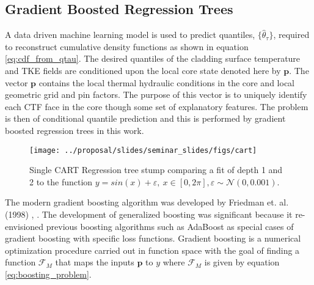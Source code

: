 \subsection{Gradient Boosted Regression Trees}
\label{chap:GBRT}

A data driven machine learning model is used to predict quantiles, $\{ \hat \theta_\tau \}$, required to reconstruct cumulative density functions as shown in equation \ref{eq:cdf_from_qtau}.  The desired quantiles of the cladding surface temperature and TKE fields are conditioned upon the local core state denoted here by $\mathbf p$.  The vector $\mathbf p$ contains the local thermal hydraulic conditions in the core and local geometric grid and pin factors.  The purpose of this vector is to uniquely identify each CTF face in the core though some set of explanatory features.  The problem is then of conditional quantile prediction and this is performed by gradient boosted regression trees in this work.

\begin{figure}[H]
    \centering
    \texttt{[image: ../proposal/slides/seminar\_slides/figs/cart]}
    \caption[Regression tree stump.]{Single CART Regression tree stump comparing a fit of depth 1 and 2 to the function $y=sin(x) + \varepsilon,\ x\in[0,2\pi], \varepsilon \sim \mathcal N(0,0.001)$.}
    \label{fig:cart}
\end{figure}

The modern gradient boosting algorithm was developed by Friedman et. al. (1998) \cite{friedman1998}, \cite{friedman2001}.  The development of generalized boosting was significant because it re-envisioned previous boosting algorithms such as AdaBoost as special cases of gradient boosting with specific loss functions.  Gradient boosting is a numerical optimization procedure carried out in function space with the goal of finding a function $\mathcal F_M$ that maps the inputs $\mathbf p$ to $y$ where $\mathcal F_M$ is given by equation \ref{eq:boosting_problem}.

